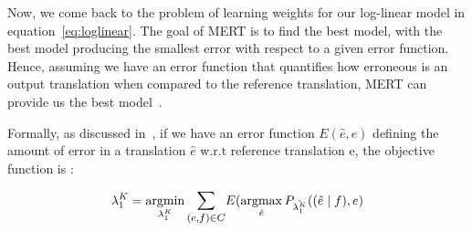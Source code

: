 Now, we come back to the problem of learning weights for our log-linear model in equation~\eqref{eq:loglinear}. The goal of MERT is to find the best model, with the best model producing the smallest error with respect to a given error function. Hence, assuming we have an error function that quantifies how erroneous is an output translation when compared to the reference translation, MERT can provide us the best model~\cite{Lopez07asurvey}.

Formally, as discussed in~\cite{Lopez07asurvey}, if we have an error function $E(\hat{e}, e)$ defining the amount of error in a translation $\hat{e}$ w.r.t reference translation e, the objective function is : 

\begin{equation} \label{eq:mininmax}
	 \lambda_{1}^{K} = \argmin_{\lambda_{1}^{K}} \mathlarger{\sum_{(e,f) \in C}} E(\argmax_{\hat{e}}P_{ \hat{\lambda_{1}^{K}}} ((\hat{e} \mid f),e)
\end{equation}

